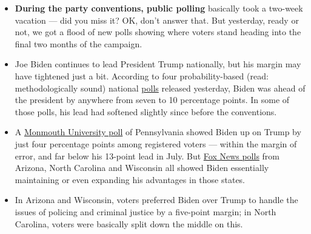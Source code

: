\begin{itemize}
\item
  \textbf{During the party conventions, public polling} basically took a
  two-week vacation --- did you miss it? OK, don't answer that. But
  yesterday, ready or not, we got a flood of new polls showing where
  voters stand heading into the final two months of the campaign.
\item
  Joe Biden continues to lead President Trump nationally, but his margin
  may have tightened just a bit. According to four probability-based
  (read: methodologically sound) national
  \href{https://www.nytimes3xbfgragh.onion/2020/09/04/world/covid-19-coronavirus.html}{polls}
  released yesterday, Biden was ahead of the president by anywhere from
  seven to 10 percentage points. In some of those polls, his lead had
  softened slightly since before the conventions.
\item
  A
  \href{https://www.monmouth.edu/polling-institute/reports/monmouthpoll_pa_090220/}{Monmouth
  University poll} of Pennsylvania showed Biden up on Trump by just four
  percentage points among registered voters --- within the margin of
  error, and far below his 13-point lead in July. But
  \href{https://www.foxnews.com/official-polls/fox-news-poll-biden-tops-trump-among-likely-voters-in-key-states}{Fox
  News polls} from Arizona, North Carolina and Wisconsin all showed
  Biden essentially maintaining or even expanding his advantages in
  those states.
\item
  In Arizona and Wisconsin, voters preferred Biden over Trump to handle
  the issues of policing and criminal justice by a five-point margin; in
  North Carolina, voters were basically split down the middle on this.
\end{itemize}

